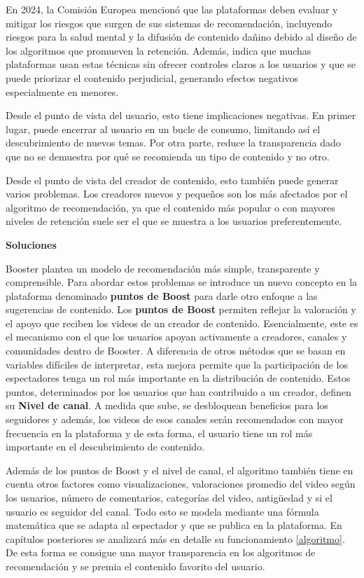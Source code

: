 En 2024, la Comisión Europea \cite{europa-alg} mencionó que las plataformas deben evaluar y mitigar los riesgos que surgen de sus sistemas de recomendación, incluyendo riesgos para la salud mental y la difusión de contenido dañino debido al diseño de los algoritmos que promueven la retención. Además, indica que muchas plataformas usan estas técnicas sin ofrecer controles claros a los usuarios y que se puede priorizar el contenido perjudicial, generando efectos negativos especialmente en menores.

Desde el punto de vista del usuario, esto tiene implicaciones negativas. En primer lugar, puede encerrar al usuario en un bucle de consumo, limitando así el descubrimiento de nuevos temas. Por otra parte, reduce la transparencia dado que no se demuestra por qué se recomienda un tipo de contenido y no otro.

Desde el punto de vista del creador de contenido, esto también puede generar varios problemas. Los creadores nuevos y pequeños son los más afectados por el algoritmo de recomendación, ya que el contenido más popular o con mayores niveles de retención suele ser el que se muestra a los usuarios preferentemente.

\textbf{Soluciones}

Booster plantea un modelo de recomendación más simple, transparente y comprensible. Para abordar estos problemas se introduce un nuevo concepto en la plataforma denominado \textbf{puntos de Boost} para darle otro enfoque a las sugerencias de contenido. 
Los \textbf{puntos de Boost} permiten reflejar la valoración y el apoyo que reciben los videos de un creador de contenido. Esencialmente, este es el mecanismo con el que los usuarios apoyan activamente a creadores, canales y comunidades dentro de Booster. A diferencia de otros métodos que se basan en variables difíciles de interpretar, esta mejora permite que la participación de los espectadores tenga un rol más importante en la distribución de contenido. Estos puntos, determinados por los usuarios que han contribuido a un creador, definen su \textbf{Nivel de canal}. A medida que sube, se desbloquean beneficios para los seguidores y además, los videos de esos canales serán recomendados con mayor frecuencia en la plataforma y de esta forma, el usuario tiene un rol más importante en el descubrimiento de contenido. 

Además de los puntos de Boost y el nivel de canal, el algoritmo también tiene en cuenta otros factores como visualizaciones, valoraciones promedio del video según los usuarios, número de comentarios, categorías del video, antigüedad y si el usuario es seguidor del canal. Todo esto se modela mediante una fórmula matemática que se adapta al espectador y que se publica en la plataforma. En capítulos posteriores se analizará más en detalle su funcionamiento \ref{algoritmo}. De esta forma se consigue una mayor transparencia en los algoritmos de recomendación y se premia el contenido favorito del usuario.

